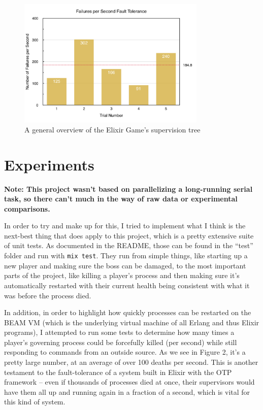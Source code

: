 \documentclass[letterpaper]{article}
\begin{document}
	\begin{figure}[ht]
		\centering
		\includegraphics[width=0.8\textwidth]{failures}
		\caption{A general overview of the Elixir Game's supervision tree}
		\label{fig:mesh2}
		\vspace*{12pt}
	\end{figure}

	\section{Experiments}

	\textbf{Note: This project wasn't based on parallelizing a long-running serial task, so there can't much in the way of raw data or experimental comparisons.}

	In order to try and make up for this, I tried to implement what I think is the next-best thing that does apply to this project, which is a pretty extensive suite of unit tests. As documented in the README, those can be found in the ``test'' folder and run with \texttt{mix test}. They run from simple things, like starting up a new player and making sure the boss can be damaged, to the most important parts of the project, like killing a player's process and then making sure it's automatically restarted with their current health being consistent with what it was before the process died.

	In addition, in order to highlight how quickly processes can be restarted on the BEAM VM (which is the underlying virtual machine of all Erlang and thus Elixir programs), I attempted to run some tests to determine how many times a player's governing process could be forcefully killed (per second) while still responding to commands from an outside source. As we see in Figure 2, it's a pretty large number, at an average of over 100 deaths per second. This is another testament to the fault-tolerance of a system built in Elixir with the OTP framework -- even if thousands of processes died at once, their supervisors would have them all up and running again in a fraction of a second, which is vital for this kind of system.
\end{document}
